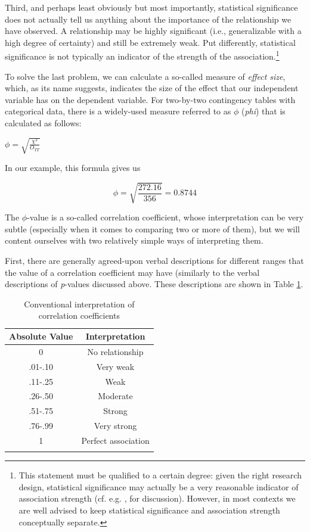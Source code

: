 Third, and perhaps least obviously but most importantly, statistical significance does not actually tell us anything about the importance of the relationship we have observed. A relationship may be highly significant (i.e., generalizable with a high degree of certainty) and still be extremely weak. Put differently, statistical significance is not typically an indicator of the strength of the association.\footnote{This statement must be qualified to a certain degree: given the right research design, statistical significance may actually be a very reasonable indicator of association strength (cf. e.g. \citep{stefanowitsch_collostructions:_2003}, \citep{gries_extending_2004} for discussion). However, in most contexts we are well advised to keep statistical significance and association strength conceptually separate.} 

To solve the last problem, we can calculate a so-called measure of \textit{effect size}, which, as its name suggests, indicates the size of the effect that our independent variable has on the dependent variable. For two-by-two contingency tables with categorical data, there is a widely-used measure referred to as $\phi$ (\textit{phi}) that is calculated as follows:

\begin{exe}
\ex $\displaystyle{\phi = \sqrt{\frac{\chi^2}{O_{TT}}}}$ 
\label{ex:formulaphi}
\end{exe}

In our example, this formula gives us 

$$\phi = \sqrt{\frac{272.16}{356}} = 0.8744$$

The $\phi$-value is a so-called correlation coefficient, whose interpretation can be very subtle (especially when it comes to comparing two or more of them), but we will content ourselves with two relatively simple ways of interpreting them.

First, there are generally agreed-upon verbal descriptions for different ranges that the value of a correlation coefficient may have (similarly to the verbal descriptions of \textit{p}-values discussed above. These descriptions are shown in Table \ref{tab:correlationlevels}.

\begin{table}[!htbp]
\caption{Conventional interpretation of correlation coefficients}
\label{tab:correlationlevels}
\begin{tabular}[t]{cc}
\lsptoprule
Absolute Value & Interpretation \\
\midrule
0 & No relationship \\
.01-.10 & Very weak \\
.11-.25 & Weak \\
.26-.50 & Moderate \\
.51-.75 & Strong \\
.76-.99 & Very strong \\
1 & Perfect association \\
\lspbottomrule
\end{tabular}
\end{table}

